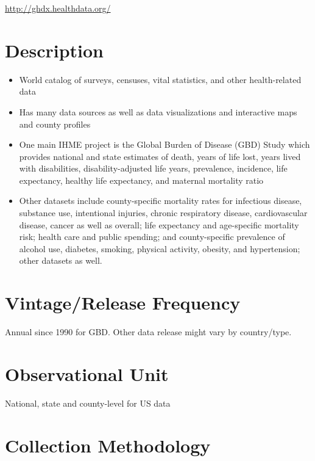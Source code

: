 \documentclass[
]{book}
\providecommand{\tightlist}{%
  \setlength{\itemsep}{0pt}\setlength{\parskip}{0pt}}
\begin{document}
\url{http://ghdx.healthdata.org/}

\hypertarget{description-28}{%
\section{Description}\label{description-28}}

\begin{itemize}
\tightlist
\item
  World catalog of surveys, censuses, vital statistics, and other health-related data
\item
  Has many data sources as well as data visualizations and interactive maps and county profiles
\item
  One main IHME project is the Global Burden of Disease (GBD) Study which provides national and state estimates of death, years of life lost, years lived with disabilities, disability-adjusted life years, prevalence, incidence, life expectancy, healthy life expectancy, and maternal mortality ratio
\item
  Other datasets include county-specific mortality rates for infectious disease, substance use, intentional injuries, chronic respiratory disease, cardiovascular disease, cancer as well as overall; life expectancy and age-specific mortality risk; health care and public spending; and county-specific prevalence of alcohol use, diabetes, smoking, physical activity, obesity, and hypertension; other datasets as well.
\end{itemize}

\hypertarget{vintagerelease-frequency-28}{%
\section{Vintage/Release Frequency}\label{vintagerelease-frequency-28}}

Annual since 1990 for GBD. Other data release might vary by country/type.

\hypertarget{observational-unit-28}{%
\section{Observational Unit}\label{observational-unit-28}}

National, state and county-level for US data

\hypertarget{collection-methodology-28}{%
\section{Collection Methodology}\label{collection-methodology-28}}
\end{document}
